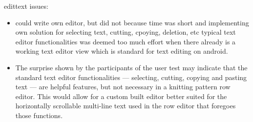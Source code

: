 edittext issues:
\begin{itemize}
\item could write own editor, but did not because time was short and implementing own solution for selecting text, cutting, cpoying, deletion, etc typical text editor functionalities was deemed too much effort when there already is a working text editor view which is standard for text editing on android.
\item The surprise shown by the participants of the user test may indicate that the standard text editor functionalities --- selecting, cutting, copying and pasting text --- are helpful features, but not necessary in a knitting pattern row editor. This would allow for a custom built editor better suited for the horizontally scrollable multi-line text used in the row editor that foregoes those functions. 
\end{itemize}